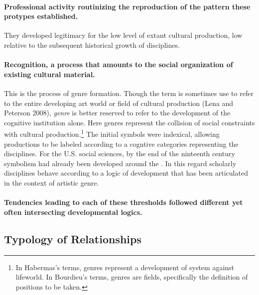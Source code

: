 \documentclass[]{article}
\let\rmarkdownfootnote\footnote%
\def\footnote{\protect\rmarkdownfootnote}
\begin{document}
\paragraph{Professional activity routinizing the reproduction of the
pattern these protypes
established.}\label{professional-activity-routinizing-the-reproduction-of-the-pattern-these-protypes-established.}

They developed legitimacy for the low level of extant cultural
production, low relative to the subsequent historical growth of
disciplines.

\paragraph{Recognition, a process that amounts to the social
organization of existing cultural
material.}\label{recognition-a-process-that-amounts-to-the-social-organization-of-existing-cultural-material.}

This is the process of genre formation. Though the term is sometimes use
to refer to the entire developing art world or field of cultural
production (Lena and Peterson 2008), \emph{genre} is better reserved to
refer to the development of the cognitive institution alone. Here genres
represent the collision of social constraints with cultural
production.\footnote{In Habermas's terms, genres represent a development
  of system against lifeworld. In Bourdieu's terms, genres are fields,
  specifically the definition of positions to be taken.} The initial
symbols were indexical, allowing productions to be labeled according to
a cogntive categories representing the disciplines. For the U.S. social
sciences, by the end of the ninteenth century symbolism had already been
developed around the . In this regard scholarly disciplines behave
according to a logic of development that has been articulated in the
context of artistic genre.

\paragraph{Tendencies leading to each of these thresholds followed
different yet often intersecting developmental
logics.}\label{tendencies-leading-to-each-of-these-thresholds-followed-different-yet-often-intersecting-developmental-logics.}

\subsection{Typology of Relationships}\label{typology-of-relationships}
\end{document}
